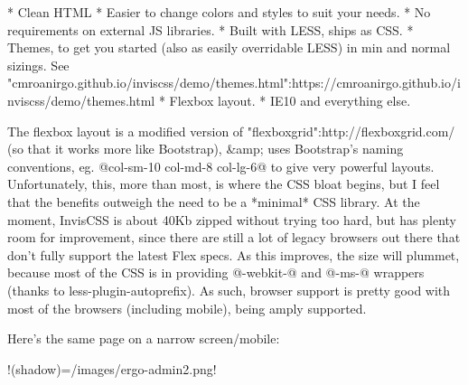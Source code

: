* Clean HTML
* Easier to change colors and styles to suit your needs. 
* No requirements on external JS libraries.
* Built with LESS, ships as CSS.
* Themes, to get you started (also as easily overridable LESS) in min and normal sizings. See "cmroanirgo.github.io/inviscss/demo/themes.html":https://cmroanirgo.github.io/inviscss/demo/themes.html
* Flexbox layout.
* IE10 and everything else.

The flexbox layout is a modified version of "flexboxgrid":http://flexboxgrid.com/ (so that it works more like Bootstrap), &amp; uses Bootstrap's naming conventions, eg. @col-sm-10 col-md-8 col-lg-6@ to give very powerful layouts. Unfortunately, this, more than most, is where the CSS bloat begins, but I feel that the benefits outweigh the need to be a *minimal* CSS library. At the moment, InvisCSS is about 40Kb zipped without trying too hard, but has plenty room for improvement, since there are still a lot of legacy browsers out there that don't fully support the latest Flex specs. As this improves, the size will plummet, because most of the CSS is in providing @-webkit-@ and @-ms-@ wrappers (thanks to less-plugin-autoprefix). As such, browser support is pretty good with most of the browsers (including mobile), being amply supported.

Here's the same page on a narrow screen/mobile:

!(shadow)=/images/ergo-admin2.png!

